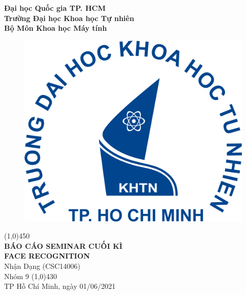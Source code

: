 \documentclass[a4paper, 12pt]{article}
\begin{document}
\begin{titlepage}
    \begin{center}
        \Large\textbf{Đại học Quốc gia TP. HCM\\Trường Đại học Khoa học Tự nhiên\\Bộ Môn Khoa học Máy tính}\\

        \vspace*{1cm}
        \begin{figure}[H]
            \begin{center}
                \includegraphics[scale=0.2]{images/hcmus-logo}
            \end{center}
        \end{figure}
        \line(1,0){450}\\[4mm]
        \LARGE\textbf{\MakeUppercase{Báo cáo Seminar Cuối kì\\ Face Recognition}}\\[3mm]
        \Large{Nhận Dạng (CSC14006)}\\[3mm]
        \Large{Nhóm 9}
        \line(1,0){430}\\

        \vfill
        TP Hồ Chí Minh, ngày 01/06/2021
    \end{center}
\end{titlepage}

\tableofcontents
\thispagestyle{empty}
\clearpage
\end{document}
